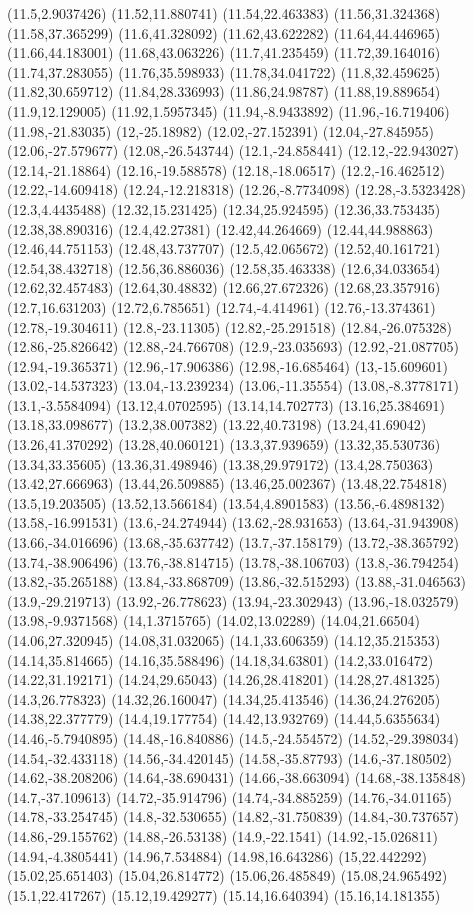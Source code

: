 (11.5,2.9037426) (11.52,11.880741) (11.54,22.463383) (11.56,31.324368) (11.58,37.365299) (11.6,41.328092) (11.62,43.622282) (11.64,44.446965) (11.66,44.183001) (11.68,43.063226) (11.7,41.235459) (11.72,39.164016) (11.74,37.283055) (11.76,35.598933) (11.78,34.041722) (11.8,32.459625) (11.82,30.659712) (11.84,28.336993) (11.86,24.98787) (11.88,19.889654) (11.9,12.129005) (11.92,1.5957345) (11.94,-8.9433892) (11.96,-16.719406) (11.98,-21.83035) (12,-25.18982) (12.02,-27.152391) (12.04,-27.845955) (12.06,-27.579677) (12.08,-26.543744) (12.1,-24.858441) (12.12,-22.943027) (12.14,-21.18864) (12.16,-19.588578) (12.18,-18.06517) (12.2,-16.462512) (12.22,-14.609418) (12.24,-12.218318) (12.26,-8.7734098) (12.28,-3.5323428) (12.3,4.4435488) (12.32,15.231425) (12.34,25.924595) (12.36,33.753435) (12.38,38.890316) (12.4,42.27381) (12.42,44.264669) (12.44,44.988863) (12.46,44.751153) (12.48,43.737707) (12.5,42.065672) (12.52,40.161721) (12.54,38.432718) (12.56,36.886036) (12.58,35.463338) (12.6,34.033654) (12.62,32.457483) (12.64,30.48832) (12.66,27.672326) (12.68,23.357916) (12.7,16.631203) (12.72,6.785651) (12.74,-4.414961) (12.76,-13.374361) (12.78,-19.304611) (12.8,-23.11305) (12.82,-25.291518) (12.84,-26.075328) (12.86,-25.826642) (12.88,-24.766708) (12.9,-23.035693) (12.92,-21.087705) (12.94,-19.365371) (12.96,-17.906386) (12.98,-16.685464) (13,-15.609601) (13.02,-14.537323) (13.04,-13.239234) (13.06,-11.35554) (13.08,-8.3778171) (13.1,-3.5584094) (13.12,4.0702595) (13.14,14.702773) (13.16,25.384691) (13.18,33.098677) (13.2,38.007382) (13.22,40.73198) (13.24,41.69042) (13.26,41.370292) (13.28,40.060121) (13.3,37.939659) (13.32,35.530736) (13.34,33.35605) (13.36,31.498946) (13.38,29.979172) (13.4,28.750363) (13.42,27.666963) (13.44,26.509885) (13.46,25.002367) (13.48,22.754818) (13.5,19.203505) (13.52,13.566184) (13.54,4.8901583) (13.56,-6.4898132) (13.58,-16.991531) (13.6,-24.274944) (13.62,-28.931653) (13.64,-31.943908) (13.66,-34.016696) (13.68,-35.637742) (13.7,-37.158179) (13.72,-38.365792) (13.74,-38.906496) (13.76,-38.814715) (13.78,-38.106703) (13.8,-36.794254) (13.82,-35.265188) (13.84,-33.868709) (13.86,-32.515293) (13.88,-31.046563) (13.9,-29.219713) (13.92,-26.778623) (13.94,-23.302943) (13.96,-18.032579) (13.98,-9.9371568) (14,1.3715765) (14.02,13.02289) (14.04,21.66504) (14.06,27.320945) (14.08,31.032065) (14.1,33.606359) (14.12,35.215353) (14.14,35.814665) (14.16,35.588496) (14.18,34.63801) (14.2,33.016472) (14.22,31.192171) (14.24,29.65043) (14.26,28.418201) (14.28,27.481325) (14.3,26.778323) (14.32,26.160047) (14.34,25.413546) (14.36,24.276205) (14.38,22.377779) (14.4,19.177754) (14.42,13.932769) (14.44,5.6355634) (14.46,-5.7940895) (14.48,-16.840886) (14.5,-24.554572) (14.52,-29.398034) (14.54,-32.433118) (14.56,-34.420145) (14.58,-35.87793) (14.6,-37.180502) (14.62,-38.208206) (14.64,-38.690431) (14.66,-38.663094) (14.68,-38.135848) (14.7,-37.109613) (14.72,-35.914796) (14.74,-34.885259) (14.76,-34.01165) (14.78,-33.254745) (14.8,-32.530655) (14.82,-31.750839) (14.84,-30.737657) (14.86,-29.155762) (14.88,-26.53138) (14.9,-22.1541) (14.92,-15.026811) (14.94,-4.3805441) (14.96,7.534884) (14.98,16.643286) (15,22.442292) (15.02,25.651403) (15.04,26.814772) (15.06,26.485849) (15.08,24.965492) (15.1,22.417267) (15.12,19.429277) (15.14,16.640394) (15.16,14.181355) 